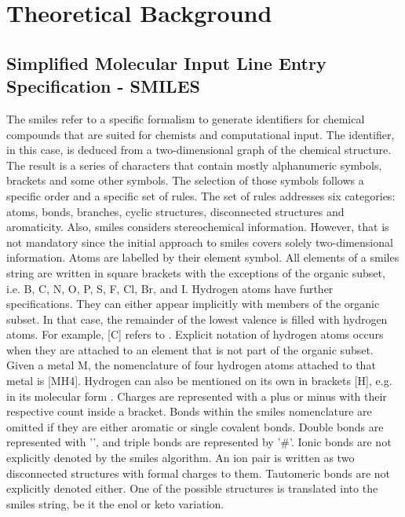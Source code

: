 \chapter{Theoretical Background}\label{sec:background}
\section{Simplified Molecular Input Line Entry Specification - SMILES}\label{sec:smiles}
The \ac{smiles} refer to a specific formalism to generate identifiers for chemical compounds that are suited for chemists and computational input. The identifier, in this case, is deduced from a two-dimensional graph of the chemical structure. The result is a series of characters that contain mostly alphanumeric symbols, brackets and some other symbols. The selection of those symbols follows a specific order and a specific set of rules. The set of rules addresses six categories: atoms, bonds, branches, cyclic structures, disconnected structures and aromaticity. Also, \ac{smiles} considers stereochemical information. However, that is not mandatory since the initial approach to \ac{smiles} covers solely two-dimensional information.\cite{Weininger1988}
Atoms are labelled by their element symbol. All elements of a \ac{smiles} string are written in square brackets with the exceptions of the organic subset, i.e. B, C, N, O, P, S, F, Cl, Br, and I. Hydrogen atoms have further specifications. They can either appear implicitly with members of the organic subset. In that case, the remainder of the lowest valence is filled with hydrogen atoms. For example, [C] refers to . Explicit notation of hydrogen atoms occurs when they are attached to an element that is not part of the organic subset. Given a metal M, the nomenclature of four hydrogen atoms attached to that metal is [MH4]. Hydrogen can also be mentioned on its own in brackets [H], e.g. in its molecular form . Charges are represented with a plus or minus with their respective count inside a bracket.\cite{Weininger1988}
Bonds within the \ac{smiles} nomenclature are omitted if they are either aromatic or single covalent bonds. Double bonds are represented with '\ch{=}', and triple bonds are represented by '\#'. Ionic bonds are not explicitly denoted by the \ac{smiles} algorithm. An ion pair is written as two disconnected structures with formal charges to them. Tautomeric bonds are not explicitly denoted either. One of the possible structures is translated into the \ac{smiles} string, be it the enol or keto variation.\cite{Weininger1988}\\
